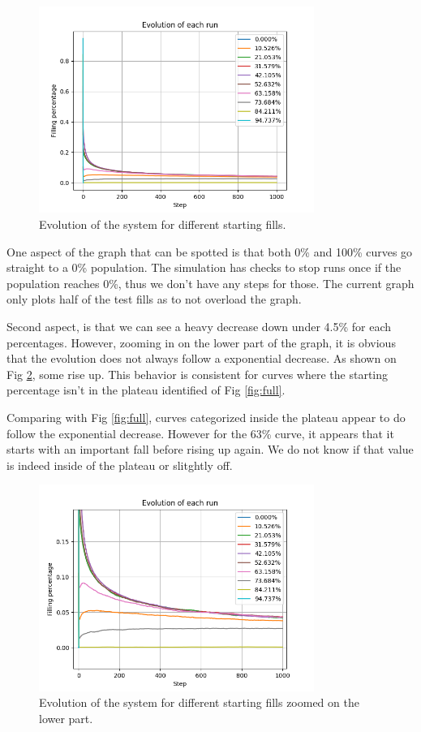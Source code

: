 \documentclass{article}
\begin{document}
\begin{figure}[htbp]
    \centering
    \includegraphics[width=0.8\textwidth]{res/Full_evolution.png}
    \caption{Evolution of the system for different starting fills.}
    \label{fig:full_evolution}
\end{figure}

One aspect of the graph that can be spotted is that both 0\% and 100\% curves go 
straight to a 0\% population. The simulation has checks to stop runs
once if the population reaches 0\%, thus we don't have any steps for those.
The current graph only plots half of the test fills as to not overload the graph.

Second aspect, is that we can see a heavy decrease down under 4.5\% for each percentages.
However, zooming in on the lower part of the graph, it is obvious that the evolution 
does not always follow a exponential decrease. As shown on Fig \ref*{fig:evolution_zoom}, some rise up.
This behavior is consistent for curves where the starting percentage isn't in the plateau identified
of Fig \ref*{fig:full}.

Comparing with Fig \ref*{fig:full}, curves categorized inside the plateau appear to do follow the
exponential decrease. However for the 63\% curve, it appears that it starts with an
important fall before rising up again. We do not know if that value is indeed inside
of the plateau or slitghtly off.
\begin{figure}[htbp]
    \centering
    \includegraphics[width=0.8\textwidth]{res/evolution_zoom.png}
    \caption{Evolution of the system for different starting fills zoomed on the lower part.}
    \label{fig:evolution_zoom}
\end{figure}
\end{document}
